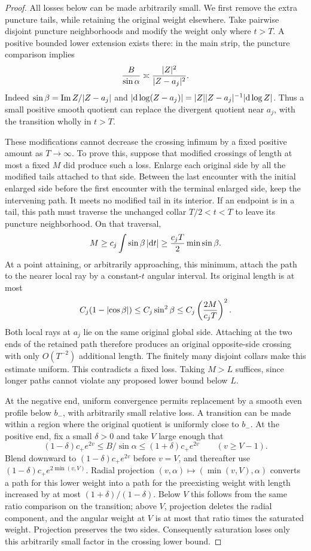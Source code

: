 \begin{proof}
All losses below can be made arbitrarily small.  We first remove the extra
puncture tails, while retaining the original weight elsewhere.  Take
pairwise disjoint puncture neighborhoods and modify the weight only where
$t>T$.  A positive bounded lower extension exists there: in the main strip,
the puncture comparison implies
\[
 \frac{B}{\sin\alpha}\asymp
 \frac{\lvert Z\rvert^2}{\lvert Z-a_j\rvert^2}.
\]
Indeed $\sin\beta=\operatorname{Im}Z/\lvert Z-a_j\rvert$ and
$\lvert\mathrm d\log(Z-a_j)\rvert=\lvert Z\rvert\lvert Z-a_j\rvert^{-1}
\lvert\mathrm d\log Z\rvert$.  Thus a small positive smooth quotient can replace the
divergent quotient near $a_j$, with the transition wholly in $t>T$.

These modifications cannot decrease the crossing infimum by a fixed
positive amount as $T\to\infty$.  To prove this, suppose that modified
crossings of length at most a fixed $M$ did produce such a loss.  Enlarge
each original side by all the modified tails attached to that side.
Between the last encounter with the initial enlarged side before the first
encounter with the terminal enlarged side, keep the intervening path.
It meets no modified tail in its interior.  If an endpoint is in a tail,
this path must traverse the unchanged collar $T/2<t<T$ to leave its
puncture neighborhood.  On that traversal,
\[
 M\ge c_j\int\sin\beta\,\lvert\mathrm d t\rvert
 \ge \frac{c_jT}{2}\min\sin\beta.
\]
At a point attaining, or arbitrarily approaching, this minimum, attach the
path to the nearer local ray by a constant-$t$ angular interval.  Its
original length is at most
\[
 C_j(1-\lvert\cos\beta\rvert)\le C_j\sin^2\beta
 \le C_j\left(\frac{2M}{c_jT}\right)^2.
\]
Both local rays at $a_j$ lie on the same original global side.  Attaching
at the two ends of the retained path therefore produces an original
opposite-side crossing with only $O(T^{-2})$ additional length.  The
finitely many disjoint collars make this estimate uniform.  This
contradicts a fixed loss.  Taking $M>L$ suffices, since longer paths
cannot violate any proposed lower bound below $L$.

At the negative end, uniform convergence permits replacement by a smooth
even profile below $b_-$, with arbitrarily small relative loss.  A transition
can be made within a region where the original quotient is uniformly
close to $b_-$.  At the positive end, fix a small $\delta>0$ and take $V$
large enough that
\[
 (1-\delta)c_+e^{2v}\le B/\sin\alpha
 \le(1+\delta)c_+e^{2v}\qquad(v\ge V-1).
\]
Blend downward to $(1-\delta)c_+e^{2v}$ before $v=V$, and thereafter use
$(1-\delta)c_+e^{2\min(v,V)}$.  Radial projection
$(v,\alpha)\mapsto(\min(v,V),\alpha)$ converts a path for this lower
weight into a path for the preexisting weight with length increased by
at most $(1+\delta)/(1-\delta)$.  Below $V$ this follows from the same
ratio comparison on the transition; above $V$, projection deletes the
radial component, and the angular weight at $V$ is at most that ratio
times the saturated weight.  Projection preserves the two sides.
Consequently saturation loses only this arbitrarily small factor in the
crossing lower bound.


\end{proof}
